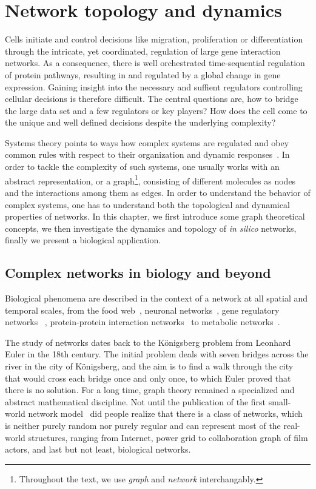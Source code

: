 \chapter{Network topology and dynamics}
\label{chap:network}

Cells initiate and control decisions like migration, proliferation or differentiation through the intricate, yet
coordinated, regulation of large gene interaction networks. 
As a consequence, there is  well orchestrated time-sequential regulation of protein pathways, resulting in and regulated by a  global change in gene expression.
Gaining insight into the necessary and suffient regulators controlling cellular decisions  is therefore difficult. 
The central questions are, how to bridge the large data set 
and a few regulators or key players? How does the cell come to the unique and well defined decisions despite the underlying complexity?

Systems theory points to ways how complex systems are regulated and obey common rules with respect to their organization and dynamic responses~\citep{Kauffman1993}. 
In order to tackle the complexity of such systems, 
one usually works with
an abstract
representation, or a graph\footnote{Throughout the text, we use \emph{graph} and \emph{network} interchangably.}, consisting of different molecules as nodes and the 
interactions among them as edges. In order to understand the
behavior of complex systems, one has to understand both
the topological and dynamical properties of networks. In this chapter, we first
introduce some graph theoretical concepts, we then investigate the dynamics and
topology of \emph{in silico} networks, finally we present a biological application.

\section{Complex networks in biology and beyond}
Biological phenomena are described in the context of a network
at all spatial and temporal scales, from the food web~\citep{Williams2000}, 
neuronal networks~\citep{White1986,Bullmore2009}, gene regulatory networks~%
\citep{Kauffman1969,Gama-Castro2008,Abdulrehman2011},
protein-protein interaction networks~\citep{Jeong2001,Stelzl2005}
to metabolic networks~\citep{Herrgaard2008}.

The study of networks dates back to the K\"onigsberg
problem from Leonhard Euler in the 18th century. The initial
problem deals with seven bridges across the river in the city
of K\"onigsberg, and the aim is to find a walk through the 
city that would cross each bridge once and only once, to which
Euler proved that there is no solution. For a long time,
graph theory remained a specialized and abstract mathematical 
discipline. Not until the publication of the first 
small-world network model~\citep{Watts1998} did people
realize that there is a class of networks, which is neither
purely random nor purely regular and can represent most of
the real-world structures, ranging from Internet, power grid
to collaboration graph of film actors, and last but not least, 
biological networks.

